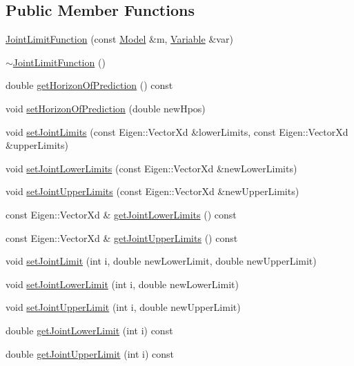 \subsection*{Public Member Functions}
\begin{DoxyCompactItemize}
\item 
\hyperlink{classocra_1_1JointLimitFunction_a00952411e7a7906fc6e5aedcfcfc6bc3}{Joint\+Limit\+Function} (const \hyperlink{classocra_1_1Model}{Model} \&m, \hyperlink{classocra_1_1Variable}{Variable} \&var)
\item 
\hyperlink{classocra_1_1JointLimitFunction_aa028e738a7dd0e89ef05628abf32d79f}{$\sim$\+Joint\+Limit\+Function} ()
\item 
double \hyperlink{classocra_1_1JointLimitFunction_ac0981cafca242d768b8b7dfb11b42a6d}{get\+Horizon\+Of\+Prediction} () const 
\item 
void \hyperlink{classocra_1_1JointLimitFunction_a02dfaf445e997387b2fd915bc398dc73}{set\+Horizon\+Of\+Prediction} (double new\+Hpos)
\item 
void \hyperlink{classocra_1_1JointLimitFunction_a9647e0888530d880ff412a057f83295d}{set\+Joint\+Limits} (const Eigen\+::\+Vector\+Xd \&lower\+Limits, const Eigen\+::\+Vector\+Xd \&upper\+Limits)
\item 
void \hyperlink{classocra_1_1JointLimitFunction_af08943f266069853dce1c491ef7f4e08}{set\+Joint\+Lower\+Limits} (const Eigen\+::\+Vector\+Xd \&new\+Lower\+Limits)
\item 
void \hyperlink{classocra_1_1JointLimitFunction_a661a85585b10ec71cbbbe6cb12523507}{set\+Joint\+Upper\+Limits} (const Eigen\+::\+Vector\+Xd \&new\+Upper\+Limits)
\item 
const Eigen\+::\+Vector\+Xd \& \hyperlink{classocra_1_1JointLimitFunction_a53b32684c35b3817243ab503ad10b767}{get\+Joint\+Lower\+Limits} () const 
\item 
const Eigen\+::\+Vector\+Xd \& \hyperlink{classocra_1_1JointLimitFunction_a1313bb9a3afd68bf762c36fa1f513761}{get\+Joint\+Upper\+Limits} () const 
\item 
void \hyperlink{classocra_1_1JointLimitFunction_a41432c4d8d08c17e90892a26963d3d5e}{set\+Joint\+Limit} (int i, double new\+Lower\+Limit, double new\+Upper\+Limit)
\item 
void \hyperlink{classocra_1_1JointLimitFunction_a490c1e19dd3897097a61d616a3e1709d}{set\+Joint\+Lower\+Limit} (int i, double new\+Lower\+Limit)
\item 
void \hyperlink{classocra_1_1JointLimitFunction_a0f83df6fab80175c07070c00d26a41b5}{set\+Joint\+Upper\+Limit} (int i, double new\+Upper\+Limit)
\item 
double \hyperlink{classocra_1_1JointLimitFunction_a90a1cd18db11dbca32e884d6c69f8d35}{get\+Joint\+Lower\+Limit} (int i) const 
\item 
double \hyperlink{classocra_1_1JointLimitFunction_afe8119238819d357e4ea741dee6ac9ad}{get\+Joint\+Upper\+Limit} (int i) const 
\end{DoxyCompactItemize}
